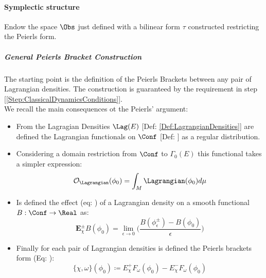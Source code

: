 \documentclass[Main]{subfiles}
\begin{document}
		\paragraph{Symplectic structure}
			Endow the space $\Obs$ just defined with a bilinear form $\tau$ constructed restricting the Peierls form.
			\subparagraph{General Peierls Bracket Construction}
			The starting point is the definition of the Peierls Brackets between any pair of Lagrangian densities.
			The construction is guaranteed by the requirement in step [\ref{Step:ClassicalDynamicsConditions}].\\
				We recall the main consequences  ot the Peierls' argument:
				\begin{itemize}
					\item From the Lagragian Densities $\Lag(E)$ [Def: \ref{Def:LagrangianDensities}] are defined the Lagrangian functionals on $\Conf$ [Def: \label{Def:LagrangianFunctionals}] as a regular distribution.
					\item Considering a domain restriction from $\Conf$ to $\Gamma_0(E)$  this functional takes a simpler expression:
					\begin{displaymath}
						\mathcal{O}_\Lagrangian( \phi_0) = \int_M \Lagrangian(\phi_0) d\mu
					\end{displaymath}
					\item Is defined the effect (eq: \label{EffectOperator}) of a Lagrangian density  on a smooth functional $B: \Conf \rightarrow \Real$ as:
						\begin{displaymath}
							\mathbf{E}_\chi^\pm B (\phi_0) = \lim_{\epsilon\rightarrow 0} \big( \frac{B(\phi_\epsilon^\pm) - B (\phi_0)} {\epsilon} \big)
						\end{displaymath}
					\item Finally for each pair of Lagrangian densities is defined the Peierls brackets form (Eq: \label{AbstractPeierlsBracket}):
						\begin{displaymath}
							\{\chi, \omega \}(\phi_0) \coloneqq E_\chi^+ F_\omega (\phi_0) - E_\chi^- F_\omega(\phi_0)
						\end{displaymath}
				\end{itemize}				 
		
\end{document}
